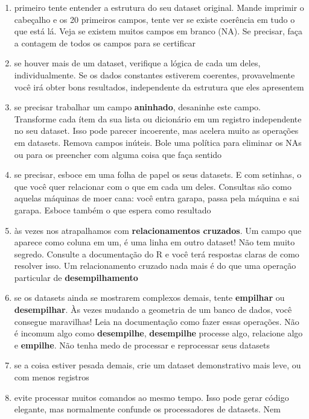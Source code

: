 \documentclass[11pt]{article}
\begin{document}
\begin{enumerate}
\def\labelenumi{\arabic{enumi}.}
\item
  primeiro tente entender a estrutura do seu dataset original. Mande
  imprimir o cabeçalho e os 20 primeiros campos, tente ver se existe
  coerência em tudo o que está lá. Veja se existem muitos campos em
  branco (NA). Se precisar, faça a contagem de todos os campos para se
  certificar
\item
  se houver mais de um dataset, verifique a lógica de cada um deles,
  individualmente. Se os dados constantes estiverem coerentes,
  provavelmente você irá obter bons resultados, independente da
  estrutura que eles apresentem
\item
  se precisar trabalhar um campo \textbf{aninhado}, desaninhe este
  campo. Transforme cada ítem da sua lista ou dicionário em um registro
  independente no seu dataset. Isso pode parecer incoerente, mas acelera
  muito as operações em datasets. Remova campos inúteis. Bole uma
  política para eliminar os NAs ou para os preencher com alguma coisa
  que faça sentido
\item
  se precisar, esboce em uma folha de papel os seus datasets. E com
  setinhas, o que você quer relacionar com o que em cada um deles.
  Consultas são como aquelas máquinas de moer cana: você entra garapa,
  passa pela máquina e sai garapa. Esboce também o que espera como
  resultado
\item
  às vezes nos atrapalhamos com \textbf{relacionamentos cruzados}. Um
  campo que aparece como coluna em um, é uma linha em outro dataset! Não
  tem muito segredo. Consulte a documentação do R e você terá respostas
  claras de como resolver isso. Um relacionamento cruzado nada mais é do
  que uma operação particular de \textbf{desempilhamento}
\item
  se os datasets ainda se mostrarem complexos demais, tente
  \textbf{empilhar} ou \textbf{desempilhar}. Às vezes mudando a
  geometria de um banco de dados, você consegue maravilhas! Leia na
  documentação como fazer essas operações. Não é incomum algo como
  \textbf{desempilhe}, \textbf{desempilhe} processe algo, relacione algo
  e \textbf{empilhe}. Não tenha medo de processar e reprocessar seus
  datasets
\item
  se a coisa estiver pesada demais, crie um dataset demonstrativo mais
  leve, ou com menos registros
\item
  evite processar muitos comandos ao mesmo tempo. Isso pode gerar código
  elegante, mas normalmente confunde os processadores de datasets. Nem

\end{enumerate}
\end{document}
